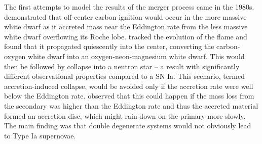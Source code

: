\documentclass[iop]{emulateapj}
\begin{document}
The first attempts to model the results of the merger process came in the
1980s. \cite{nomotoiben:1985} demonstrated that off-center carbon
ignition would occur in the more massive white dwarf as it accreted
mass near the Eddington rate from the less massive white dwarf
overflowing its Roche lobe. \cite{saionomoto:1985} tracked the
evolution of the flame and found that it propagated quiescently into
the center, converting the carbon-oxygen white dwarf into an
oxygen-neon-magnesium white dwarf. This would then be followed by
collapse into a neutron star -- a result with significantly different
observational properties compared to a SN Ia. This scenario, termed
accretion-induced collapse, would be avoided only if the accretion
rate were well below the Eddington rate. \cite{tutukov_yungelson:1979}
observed that this could happen if the mass loss from the secondary
was higher than the Eddington rate and thus the accreted material
formed an accretion disc, which might rain down on the primary more
slowly. The main finding was that double degenerate systems would not
obviously lead to Type Ia supernovae.
\end{document}
